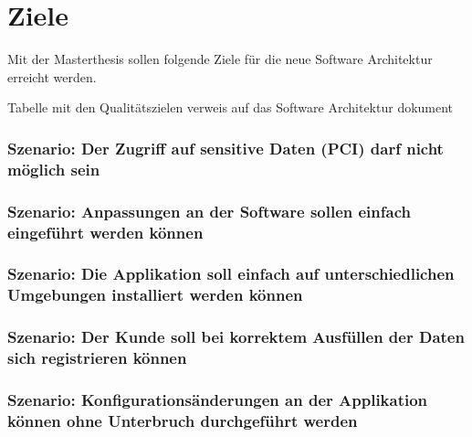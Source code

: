 \chapter{Ziele}

Mit der Masterthesis sollen folgende Ziele für die neue Software Architektur erreicht werden.

Tabelle mit den Qualitätszielen
verweis auf das Software Architektur dokument

\subsection{Szenario: Der Zugriff auf sensitive Daten (PCI) darf nicht möglich sein}

\subsection{Szenario: Anpassungen an der Software sollen einfach eingeführt werden können}



\subsection{Szenario: Die Applikation soll einfach auf unterschiedlichen Umgebungen installiert werden können}



\subsection{Szenario: Der Kunde soll bei korrektem Ausfüllen der Daten sich registrieren können}


\subsection{Szenario: Konfigurationsänderungen an der Applikation können ohne Unterbruch durchgeführt werden}

